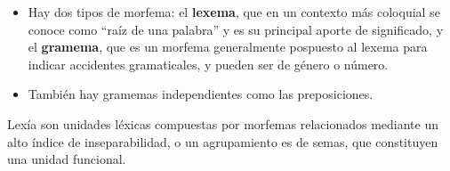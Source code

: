 \begin{itemize}
\item Hay dos tipos de morfema: el \textbf{lexema}, que en un contexto más
coloquial se conoce como “raíz de una palabra” y es su principal
aporte de significado, y el \textbf{gramema}, que es un morfema generalmente pospuesto al lexema para indicar accidentes gramaticales,
y pueden ser de género o número.
\item También hay gramemas independientes como las preposiciones.\\

\end{itemize}

\begin{defn}
Lexía son unidades léxicas compuestas por morfemas relacionados mediante un alto índice de inseparabilidad, o un agrupamiento es de semas, que constituyen una unidad funcional.

\end{defn}



